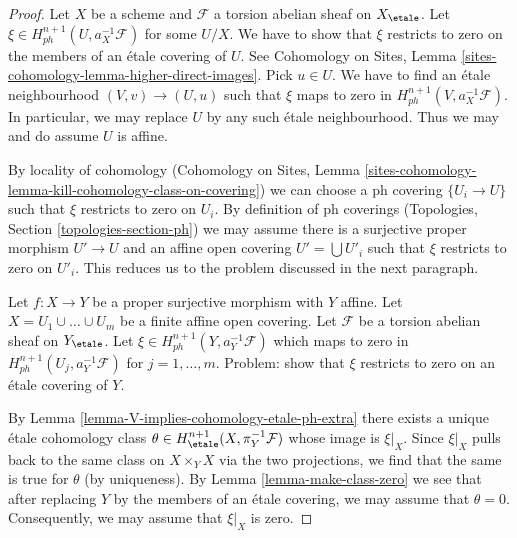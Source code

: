 \begin{proof}
Let $X$ be a scheme and $\mathcal{F}$ a torsion abelian sheaf on $X_\etale$.
Let $\xi \in H^{n + 1}_{ph}(U, a_X^{-1}\mathcal{F})$ for some $U/X$.
We have to show that $\xi$ restricts to zero on the members of an
\'etale covering of $U$. See Cohomology on Sites,
Lemma \ref{sites-cohomology-lemma-higher-direct-images}.
Pick $u \in U$. We have to find an \'etale neighbourhood
$(V, v) \to (U, u)$
such that $\xi$ maps to zero in $H^{n + 1}_{ph}(V, a_X^{-1}\mathcal{F})$.
In particular, we may replace $U$ by any such \'etale neighbourhood.
Thus we may and do assume $U$ is affine.

\medskip\noindent
By locality of cohomology (Cohomology on Sites, Lemma
\ref{sites-cohomology-lemma-kill-cohomology-class-on-covering})
we can choose a ph covering $\{U_i \to U\}$
such that $\xi$ restricts to zero on $U_i$.
By definition of ph coverings (Topologies, Section \ref{topologies-section-ph})
we may assume there is a surjective proper morphism
$U' \to U$ and an affine open covering $U' = \bigcup U'_i$
such that $\xi$ restricts to zero on $U'_i$. This reduces us to the
problem discussed in the next paragraph.

\medskip\noindent
Let $f : X \to Y$ be a proper surjective morphism with $Y$ affine.
Let $X = U_1 \cup \ldots \cup U_m$ be a finite affine open covering.
Let $\mathcal{F}$ be a torsion abelian sheaf on $Y_\etale$.
Let $\xi \in H^{n + 1}_{ph}(Y, a_Y^{-1}\mathcal{F})$
which maps to zero in $H^{n + 1}_{ph}(U_j, a_Y^{-1}\mathcal{F})$
for $j = 1, \ldots, m$.
Problem: show that $\xi$ restricts to zero on an \'etale covering of $Y$.

\medskip\noindent
By Lemma \ref{lemma-V-implies-cohomology-etale-ph-extra} there exists a
unique \'etale cohomology class
$\theta \in H^{n + 1}_\etale(X, \pi_Y^{-1}\mathcal{F})$
whose image is $\xi|_X$.
Since $\xi|_X$ pulls back to the same class on $X \times_Y X$
via the two projections, we find that the same is true for $\theta$
(by uniqueness).
By Lemma \ref{lemma-make-class-zero}
we see that after replacing $Y$ by the members of an \'etale covering,
we may assume that $\theta = 0$.
Consequently, we may assume that $\xi|_X$ is zero.


\end{proof}
